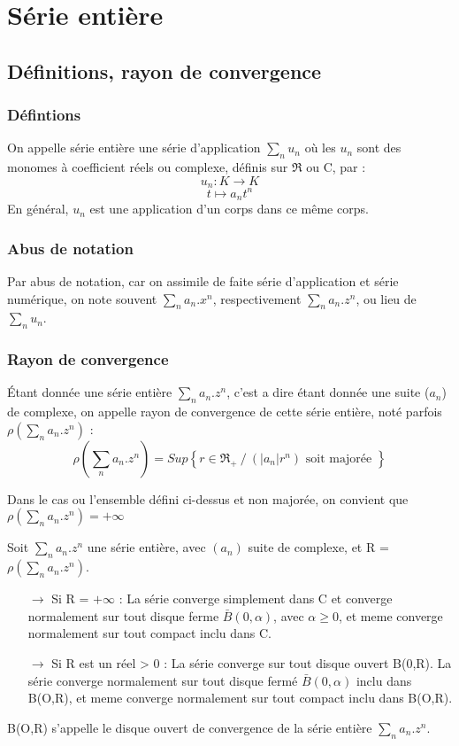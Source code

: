 \chapter{Série entière}
\section{Définitions, rayon de convergence}
\subsection{Défintions}
\begin{de}
On appelle série entière une série d'application $\underset{n}\sum u_n$ où les $u_n$ sont des monomes à coefficient réels ou complexe, définis sur $\Re$ ou C, par : 
$$u_n : K \rightarrow K$$
$$ t \mapsto a_n t^n$$
En général, $u_n$ est une application d'un corps dans ce même corps.
\end{de}
\subsection{Abus de notation}
Par abus de notation, car on assimile de faite série d'application et série numérique, on note souvent $\underset{n} \sum a_n.x^n$, respectivement $\underset{n} \sum a_n.z^n$, ou lieu de $\underset{n}\sum u_n$.
\subsection{Rayon de convergence}
\begin{de}
Étant donnée une série entière $\underset{n} \sum a_n.z^n$, c'est a dire étant donnée une suite ($a_n$) de complexe, on appelle rayon de convergence de cette série entière, noté parfois $\rho(\underset{n} \sum a_n.z^n)$ : 
$$\rho(\underset{n} \sum a_n.z^n) = Sup\left\lbrace r \in \Re_+ ~/~ (|a_n|r^n) \mbox{ soit majorée }  \right\rbrace $$
\end{de}
\begin{prop}
Dans le cas ou l'ensemble défini ci-dessus et non majorée, on convient que $\rho(\underset{n} \sum a_n.z^n) = + \infty$
\end{prop}
\begin{prop}
Soit $\underset{n} \sum a_n.z^n$ une série entière, avec $(a_n)$ suite de complexe, et R = $\rho(\underset{n} \sum a_n.z^n)$.
\begin{itemize}
 \item[$\rightarrow$] Si R = $+ \infty$ : La série converge simplement dans C et converge normalement sur tout disque ferme $\bar{B}(0,\alpha)$, avec $\alpha \geq 0$, et meme converge normalement sur tout compact inclu dans C.
 \item[$\rightarrow$] Si R est un réel > 0 : La série converge sur tout disque ouvert B(0,R). La série converge normalement sur tout disque fermé $\bar{B}(0,\alpha)$ inclu dans B(O,R), et meme converge normalement sur tout compact inclu dans B(O,R). 
\end{itemize}
\end{prop}
\begin{voc}
B(O,R) s'appelle le disque ouvert de convergence de la série entière $\underset{n} \sum a_n.z^n$.
\end{voc}
